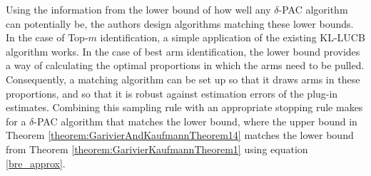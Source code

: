 \documentclass[12pt,]{article}
\begin{document}
Using the information from the lower bound of how well any
\(\delta\)-PAC algorithm can potentially be, the authors design
algorithms matching these lower bounds. In the case of Top-\(m\)
identification, a simple application of the existing KL-LUCB algorithm
works. In the case of best arm identification, the lower bound provides
a way of calculating the optimal proportions in which the arms need to
be pulled. Consequently, a matching algorithm can be set up so that it
draws arms in these proportions, and so that it is robust against
estimation errors of the plug-in estimates. Combining this sampling rule
with an appropriate stopping rule makes for a \(\delta\)-PAC algorithm
that matches the lower bound, where the upper bound in Theorem
\ref{theorem:GarivierAndKaufmannTheorem14} matches the lower bound from
Theorem \ref{theorem:GarivierKaufmannTheorem1} using equation
\eqref{bre_approx}.
\end{document}
